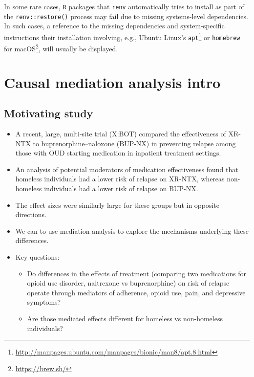 \documentclass[
  12pt,
]{book}
\newcommand{\passthrough}[1]{#1}
\providecommand{\tightlist}{%
  \setlength{\itemsep}{0pt}\setlength{\parskip}{0pt}}
\renewcommand{\href}[2]{#2\footnote{\url{#1}}}
\theoremstyle{definition}
\theoremstyle{definition}
\theoremstyle{definition}
\newcommand{\1}{\mathbbm{1}}
\begin{document}
In some rare cases, \passthrough{\lstinline!R!} packages that \passthrough{\lstinline!renv!} automatically tries to install as
part of the \passthrough{\lstinline!renv::restore()!} process may fail due to missing systems-level
dependencies. In such cases, a reference to the missing dependencies and
system-specific instructions their installation involving, e.g., \href{http://manpages.ubuntu.com/manpages/bionic/man8/apt.8.html}{Ubuntu
Linux's \passthrough{\lstinline!apt!}} or
\href{https://brew.sh/}{\passthrough{\lstinline!homebrew!} for macOS}, will usually be displayed.

\hypertarget{mediation}{%
\chapter{Causal mediation analysis intro}\label{mediation}}

\hypertarget{motivating-study}{%
\section{Motivating study}\label{motivating-study}}

\begin{itemize}
\item
  A recent, large, multi-site trial (X:BOT) compared the effectiveness of XR-NTX
  to buprenorphine--naloxone (BUP-NX) in preventing relapse among those with OUD
  starting medication in inpatient treatment settings.
\item
  An analysis of potential moderators of medication effectiveness found that
  homeless individuals had a lower risk of relapse on XR-NTX, whereas
  non-homeless individuals had a lower risk of relapse on BUP-NX.
\item
  The effect sizes were similarly large for these groups but in opposite
  directions.
\item
  We can to use mediation analysis to explore the mechanisms underlying these differences.
\item
  Key questions:

  \begin{itemize}
  \tightlist
  \item
    Do differences in the effects of treatment (comparing two medications for
    opioid use disorder, naltrexone vs buprenorphine) on risk of relapse operate
    through mediators of adherence, opioid use, pain, and depressive symptoms?
    \citep{rudolph2020explaining}
  \item
    Are those mediated effects different for homeless vs non-homeless
    individuals?
  \end{itemize}
\end{itemize}
\end{document}
